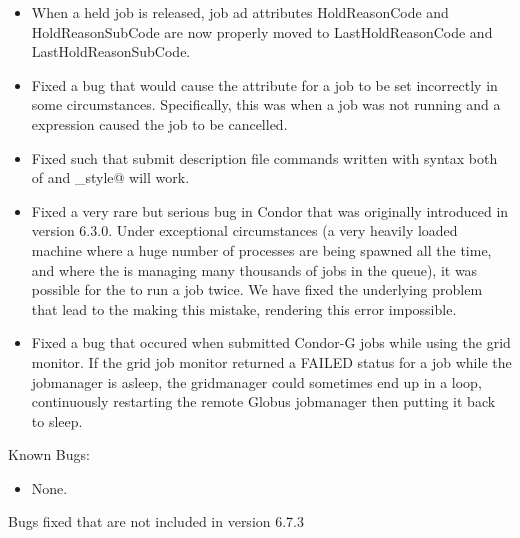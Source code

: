 \begin{itemize}
\item When a held job is released, job ad attributes HoldReasonCode and
  HoldReasonSubCode are now properly moved to LastHoldReasonCode and
  LastHoldReasonSubCode.

\item Fixed a bug that would cause the  attribute
  for a job 
  to be set incorrectly in some circumstances.
  Specifically, this was when a job
  was not running and a  expression
  caused the job to be cancelled.

\item Fixed  such that submit description file
  commands written with syntax both of
  \verb@ThisStyle@ and \verb@this_style@ will work.

\item Fixed a very rare but serious bug in Condor that was originally
  introduced in version 6.3.0.
  Under exceptional circumstances (a very heavily loaded machine where
  a huge number of processes are being spawned all the time, and where
  the  is managing many thousands of jobs in the
  queue), it was possible for the  to run a job twice.
  We have fixed the underlying problem that lead to the
   making this mistake, rendering this error
  impossible.

\item Fixed a bug that occured when submitted Condor-G jobs while
  using the grid monitor. If the grid job monitor returned a FAILED
  status for a job while the jobmanager is asleep, the gridmanager
  could sometimes end up in a loop, continuously restarting the remote
  Globus jobmanager then putting it back to sleep.

\end{itemize}

\noindent Known Bugs:

\begin{itemize}

\item None.

\end{itemize}

\noindent Bugs fixed that are not included in version 6.7.3

